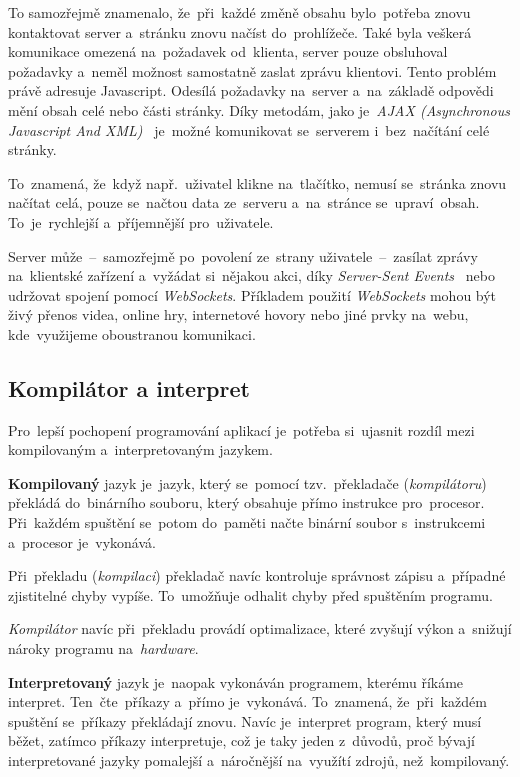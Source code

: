 \documentclass[10pt,a4paper]{article}
\begin{document}
            To samozřejmě znamenalo, že~při~každé změně obsahu bylo~potřeba znovu kontaktovat server a~stránku znovu načíst do~prohlížeče. Také byla veškerá komunikace omezená na~požadavek od~klienta, server pouze obsluhoval požadavky a~neměl možnost samostatně zaslat zprávu klientovi. Tento problém právě adresuje Javascript. Odesílá požadavky na~server a~na~základě odpovědi mění obsah celé nebo části stránky. Díky metodám, jako je~\emph{AJAX (Asynchronous Javascript And XML)}~\cite{ajax:mdn} je~možné komunikovat se~serverem i~bez~načítání celé stránky.

            To~znamená, že~když např.~uživatel klikne na~tlačítko, nemusí se~stránka znovu načítat celá, pouze se~načtou data ze~serveru a~na~stránce se~upraví~obsah. To~je~rychlejší a~příjemnější pro~uživatele.

            Server může~--~samozřejmě po~povolení ze~strany uživatele~--~zasílat zprávy na~klientské zařízení a~vyžádat si~nějakou akci, díky \emph{Server-Sent Events}~\cite{sse:mdn} nebo udržovat spojení pomocí \emph{WebSockets}. Příkladem použití \emph{WebSockets} mohou být živý přenos videa, online hry, internetové hovory nebo jiné prvky na~webu, kde~využijeme oboustranou komunikaci.~\cite{websocket:mdn}

        \subsection{Kompilátor a interpret}
            Pro~lepší pochopení programování aplikací je~potřeba si~ujasnit rozdíl mezi kompilovaným a~interpretovaným jazykem.

            \textbf{Kompilovaný} jazyk je~jazyk, který se~pomocí tzv.~překladače (\emph{kompilátoru}) překládá do~binárního souboru, který obsahuje přímo instrukce pro~procesor. Při~každém spuštění se~potom do~paměti načte binární soubor s~instrukcemi a~procesor je~vykonává.
            
            Při~překladu (\emph{kompilaci}) překladač navíc kontroluje správnost zápisu a~případné zjistitelné chyby vypíše. To~umožňuje odhalit chyby před spuštěním programu.

            \emph{Kompilátor} navíc při~překladu provádí optimalizace, které zvyšují výkon a~snižují nároky programu na~\emph{hardware}.

            \textbf{Interpretovaný} jazyk je~naopak vykonáván programem, kterému říkáme interpret. Ten~čte~příkazy a~přímo je~vykonává. To~znamená, že~při~každém spuštění se~příkazy překládají znovu. Navíc je~interpret program, který musí běžet, zatímco příkazy interpretuje, což je taky jeden z~důvodů, proč bývají interpretované jazyky pomalejší a~náročnější na~využítí zdrojů, než~kompilovaný.
            
\end{document}
